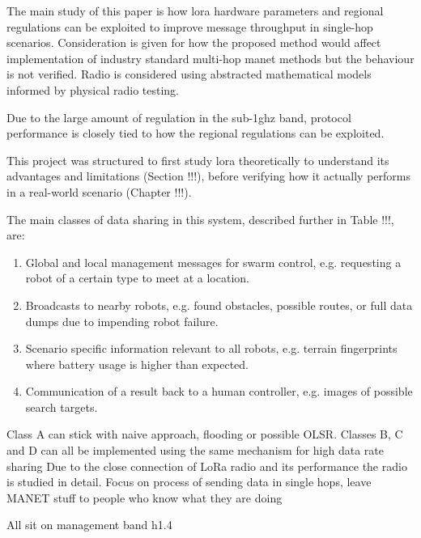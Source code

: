 The main study of this paper is how \ac{lora} hardware parameters and regional regulations can be exploited to improve message throughput in single-hop scenarios. Consideration is given for how the proposed method would affect implementation of industry standard multi-hop \ac{manet} methods but the behaviour is not verified. Radio is considered using abstracted mathematical models informed by physical radio testing.


Due to the large amount of regulation in the sub-1ghz band, protocol performance is closely tied to how the regional regulations can be exploited.

  This project was structured to first study \ac{lora} theoretically to understand its advantages and limitations (Section !!!), before verifying how it actually performs in a real-world scenario (Chapter !!!).
  
  

The main classes of data sharing in this system, described further in Table !!!, are: 
\begin{enumerate}[label=\textbf{\Alph*}]
  	\item Global and local management messages for swarm control, e.g. requesting a robot of a certain type to meet at a location.\label{ref:msgTypeControl}
  	\item Broadcasts to nearby robots, e.g. found obstacles, possible routes, or full data dumps due to impending robot failure. \label{ref:msgTypeLocalBroadcast}
  	\item Scenario specific information relevant to all robots, e.g. terrain fingerprints where battery usage is higher than expected. \label{ref:msgTypeGlobalBroadcast}
  	\item Communication of a result back to a human controller, e.g. images of possible search targets.\label{ref:msgTypeUnicast}
\end{enumerate}

Class A can stick with naive approach, flooding or possible OLSR.
Classes B, C and D can all be implemented using the same mechanism for high data rate sharing 
Due to the close connection of LoRa radio and its performance the radio is studied in detail.
Focus on process of sending data in single hops, leave MANET stuff to people who know what they are doing


All sit on management band h1.4






